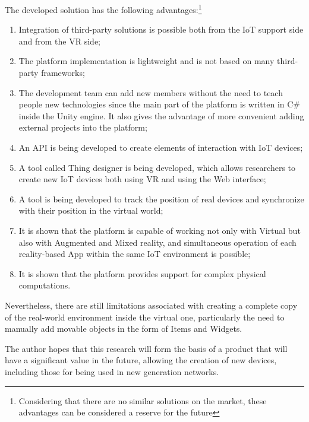 The developed solution has the following advantages:\footnote{Considering that there are no similar solutions on the market, these advantages can be considered a reserve for the future}
\begin{enumerate}
    \item Integration of third-party solutions is possible both from the IoT support side and from the VR side;
    \item The platform implementation is lightweight and is not based on many third-party frameworks;
    \item The development team can add new members without the need to teach people new technologies since the main part of the platform is written in C\# inside the Unity engine. It also gives the advantage of more convenient adding external projects into the platform;
    \item An API is being developed to create elements of interaction with IoT devices;
    \item A tool called Thing designer is being developed, which allows researchers to create new IoT devices both using VR and using the Web interface;
    \item A tool is being developed to track the position of real devices and synchronize with their position in the virtual world;
    \item It is shown that the platform is capable of working not only with Virtual but also with Augmented and Mixed reality, and simultaneous operation of each reality-based App within the same IoT environment is possible;
    \item It is shown that the platform provides support for complex physical computations.
\end{enumerate}

Nevertheless, there are still limitations associated with creating a complete copy of the real-world environment inside the virtual one, particularly the need to manually add movable objects in the form of Items and Widgets.

The author hopes that this research will form the basis of a product that will have a significant value in the future, allowing the creation of new devices, including those for being used in new generation networks.